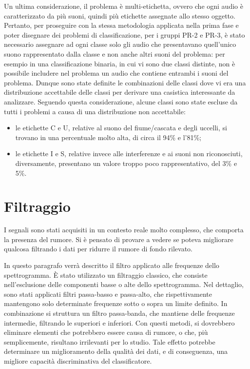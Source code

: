 Un ultima considerazione, il problema è multi-etichetta, ovvero che ogni audio è
caratterizzato da più suoni, quindi più etichette assegnate allo stesso oggetto. Pertanto, per
proseguire con la stessa metodologia applicata nella prima fase e poter disegnare dei
problemi di classificazione, per i gruppi PR-2 e PR-3, è stato necessario assegnare ad ogni
classe solo gli audio che presentavano quell’unico suono rappresentato dalla classe e non
anche altri suoni del problema: per esempio in una classificazione binaria, in cui vi sono due
classi distinte, non è possibile includere nel problema un audio che contiene entrambi i suoni del problema.
Dunque sono state definite le combinazioni delle classi dove vi era una distribuzione
accettabile delle classi per derivare una casistica interessante da analizzare. Seguendo questa
considerazione, alcune classi sono state escluse da tutti i problemi a causa di una
distribuzione non accettabile:
\begin{itemize}
	\item{le etichette C e U, relative al suono del fiume/cascata e degli uccelli, si trovano in una
	percentuale molto alta, di circa il 94\% e l’81\%;}
	\item{le etichette I e S, relative invece alle interferenze e ai suoni non riconosciuti,
	diversamente, presentano un valore troppo poco rappresentativo, del 3\% e 5\%.}
\end{itemize}

\section{Filtraggio}
I segnali sono stati acquisiti in un contesto reale molto complesso, che comporta la presenza
del rumore. Si è pensato di provare a vedere se poteva migliorare qualcosa filtrando i dati per
ridurre il rumore di fondo rilevato.

In questo paragrafo verrà descritto il filtro applicato alle frequenze dello spettrogramma. È
stato utilizzato un filtraggio classico, che consiste nell’esclusione delle componenti basse o
alte dello spettrogramma. Nel dettaglio, sono stati applicati filtri passa-basso e passa-alto,
che rispettivamente mantengono solo determinate frequenze sotto o sopra un limite definito.
In combinazione si struttura un filtro passa-banda, che mantiene delle frequenze intermedie,
filtrando le superiori e inferiori. Con questi metodi, si dovrebbero eliminare elementi che
potrebbero essere causa di rumore, o che, più semplicemente, risultano irrilevanti per lo
studio. Tale effetto potrebbe determinare un miglioramento della qualità dei dati, e di
conseguenza, una migliore capacità discriminativa del classificatore.

